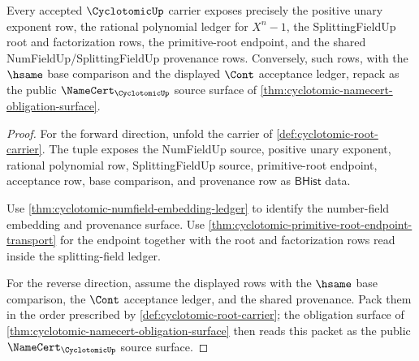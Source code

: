 \begin{theorem}
\label{thm:cyclotomic-polynomial-ledger-exactness}
Every accepted $\CyclotomicUp$ carrier exposes precisely the positive unary exponent row, the rational polynomial ledger for $X^n-1$, the SplittingFieldUp root and factorization rows, the primitive-root endpoint, and the shared NumFieldUp/SplittingFieldUp provenance rows. Conversely, such rows, with the $\hsame$ base comparison and the displayed $\Cont$ acceptance ledger, repack as the public $\NameCert_{\CyclotomicUp}$ source surface of \autoref{thm:cyclotomic-namecert-obligation-surface}.
\end{theorem}
\begin{proof}
For the forward direction, unfold the carrier of \autoref{def:cyclotomic-root-carrier}. The tuple exposes the NumFieldUp source, positive unary exponent, rational polynomial row, SplittingFieldUp source, primitive-root endpoint, acceptance row, base comparison, and provenance row as $\mathsf{BHist}$ data.

Use \autoref{thm:cyclotomic-numfield-embedding-ledger} to identify the number-field embedding and provenance surface. Use \autoref{thm:cyclotomic-primitive-root-endpoint-transport} for the endpoint together with the root and factorization rows read inside the splitting-field ledger.

For the reverse direction, assume the displayed rows with the $\hsame$ base comparison, the $\Cont$ acceptance ledger, and the shared provenance. Pack them in the order prescribed by \autoref{def:cyclotomic-root-carrier}; the obligation surface of \autoref{thm:cyclotomic-namecert-obligation-surface} then reads this packet as the public $\NameCert_{\CyclotomicUp}$ source surface.
\end{proof}

